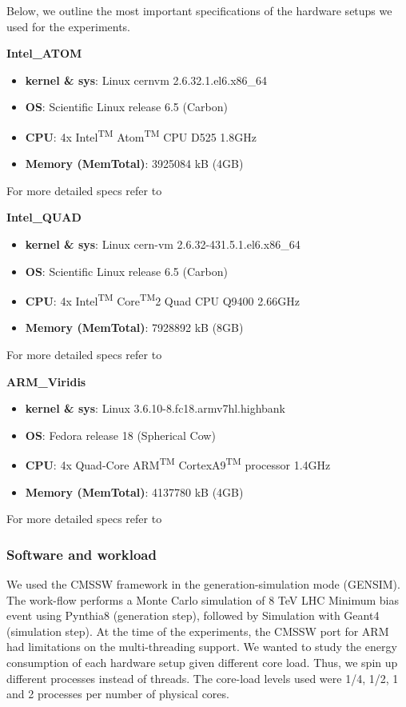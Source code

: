 Below, we outline the most important specifications of the hardware setups we used for the experiments.

\vspace{10mm}
\textbf{Intel\_ATOM}
\begin{itemize}
  \item[] \textbf{kernel \& sys}:  Linux cern\-vm 2.6.32.1.el6.x86\_64
  \item[] \textbf{OS}: Scientific Linux release 6.5 (Carbon)
  \item[] \textbf{CPU}:   4x Intel\textsuperscript{TM} Atom\textsuperscript{TM} CPU D525 \@ 1.8GHz
  \item[] \textbf{Memory  (MemTotal)}:        3925084  kB (4GB)
\end{itemize}

For more detailed specs refer to \cite{atom_specs}

\vspace{10mm}
\textbf{Intel\_QUAD}
\begin{itemize}
  \item[] \textbf{kernel \& sys}:  Linux cern-vm 2.6.32-431.5.1.el6.x86\_64
  \item[] \textbf{OS}: Scientific Linux release 6.5 (Carbon)
  \item[] \textbf{CPU}:    4x Intel\textsuperscript{TM} Core\textsuperscript{TM}2 Quad CPU  Q9400  \@ 2.66GHz
  \item[] \textbf{Memory  (MemTotal)}:        7928892 kB (8GB)
\end{itemize}

For more detailed specs refer to \cite{quad_specs}

\vspace{10mm}
\textbf{ARM\_Viridis}
\begin{itemize}
  \item[] \textbf{kernel \& sys}:  Linux  3.6.10-8.fc18.armv7hl.highbank
  \item[] \textbf{OS}: Fedora release 18 (Spherical Cow)
  \item[] \textbf{CPU}:    4x Quad-Core ARM\textsuperscript{TM} CortexA9\textsuperscript{TM} processor \@1.4GHz
  \item[] \textbf{Memory  (MemTotal)}:        4137780 kB (4GB) 
\end{itemize}

For more detailed specs refer to \cite{viridis_specs}


\subsubsection*{Software and workload}
We used the CMSSW framework in the generation-simulation mode (GEN\-SIM). The work-flow performs a Monte Carlo simulation of 8 TeV LHC Minimum bias event using Pynthia8 (generation step), followed by Simulation with Geant4 (simulation step).
At the time of the experiments, the CMSSW port for ARM had limitations on the multi-threading support. We wanted to study the energy consumption of each hardware setup given different core load. Thus, we spin up different processes instead of threads. The core-load levels used were 1/4, 1/2, 1 and 2 processes per number of physical cores. 

